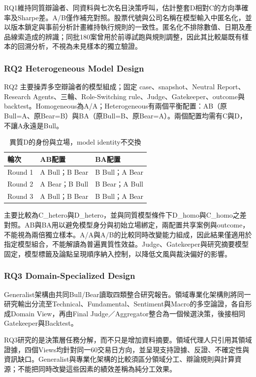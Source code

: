 \documentclass[12pt,a4paper]{article}
\begin{document}
\begin{CJK}{UTF8}{bkai}
RQ1維持同質辯論者、同資料與七次名目決策呼叫，估計整套D相對C的方向準確率及Sharpe差。A/B僅作補充對照。股票代號與公司名稱在模型輸入中匿名化，並以版本鎖定與事前分析計畫維持執行規則的一致性。匿名化不排除數值、日期及產品線索造成的辨識；同批180案曾用於前導試跑與規則調整，因此其比較屬既有樣本的回溯分析，不視為未見樣本的獨立驗證。

\subsubsection{RQ2 Heterogeneous Model Design}

RQ2 主要操弄多空辯論者的模型組成；固定 case、snapshot、Neutral Report、Research Agents、三輪、Role-Switching rule、Judge、Gatekeeper、outcome與backtest。Homogeneous為A/A；Heterogeneous有兩個平衡配置：AB（原Bull=A、原Bear=B）與BA（原Bull=B、原Bear=A）。兩個配置均需有C與D，不讓A永遠是Bull。
\begin{table}[H]\centering\small
\caption{異質D的身份與立場，model identity不交換}
\begin{tabularx}{\textwidth}{@{}lYY@{}}\toprule
輪次 & AB配置 & BA配置\\\midrule
Round 1 & A Bull；B Bear & B Bull；A Bear\\
Round 2 & A Bear；B Bull & B Bear；A Bull\\
Round 3 & A Bull；B Bear & B Bull；A Bear\\\bottomrule\end{tabularx}\end{table}
主要比較為C\_hetero與D\_hetero，並與同質模型條件下D\_homo與C\_homo之差對照。AB與BA用以避免模型身分與初始立場綁定，兩配置共享案例與outcome，不能視為兩倍獨立樣本。A/A與A/B的比較同時改變能力組成，因此結果僅適用於指定模型組合，不能解讀為普遍異質性效益。Judge、Gatekeeper與研究摘要模型固定，模型標籤及論點呈現順序納入控制，以降低文風與裁決偏好的影響。

\subsubsection{RQ3 Domain-Specialized Design}
Generalist架構由共同Bull/Bear讀取四類整合研究報告。領域專業化架構則將同一研究輸出分流至Technical、Fundamental、Sentiment與Macro的多空論證，各自形成Domain View，再由Final Judge／Aggregator整合為一個候選決策，後接相同Gatekeeper與Backtest。

RQ3研究的是決策層任務分解，而不只是增加資料摘要。領域代理人只引用其領域證據，四個Views均針對同一60交易日方向，並呈現支持證據、反證、不確定性與資訊缺口。Generalist與專業化架構的比較須區分領域分工、辯論規則與計算資源；不能把同時改變這些因素的績效差稱為純分工效果。


\end{CJK}
\end{document}
